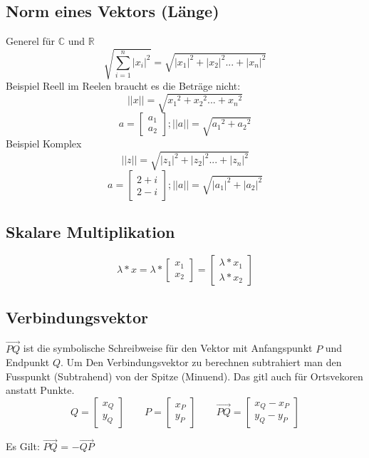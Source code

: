 \documentclass[10pt,a4paper,twocolumn]{article}
\begin{document}
	\subsection{Norm eines Vektors (Länge)}
	Generel für $\mathbb{C}$ und  $\mathbb{R}$
	$$\sqrt{\sum_{i=1}^n |x_i|^2} =\sqrt{|x_1|^2+|x_2|^2...+|x_n|^2}$$
	Beispiel Reell
	im Reelen braucht es die Beträge nicht:
	$$||x|| = \sqrt{{x_1}^2+{x_2}^2 ... + {x_n}^2}$$
	$$a=\begin{bmatrix}
		a_{1} \\
		a_{2}
	\end{bmatrix}; ||a|| = \sqrt{{a_1}^2+{a_2}^2} $$
	Beispiel Komplex
	$$||z|| = \sqrt{{|z_1|}^2+{|z_2|}^2 ... + {|z_n|}^2}$$
	$$a=\begin{bmatrix}
		2+i \\
		2-i
	\end{bmatrix}; ||a|| = \sqrt{|a_1|^2+|a_2|^2} $$
	\subsection{Skalare Multiplikation}
	$$\lambda * x = \lambda * \begin{bmatrix} x_1 \\ x_2 \end{bmatrix} = \begin{bmatrix} \lambda *x_1 \\ \lambda * x_2 \end{bmatrix}$$
	\subsection{Verbindungsvektor}
	$\overrightarrow{PQ}$ ist die symbolische Schreibweise für den Vektor mit Anfangspunkt $P$ und Endpunkt $Q$. Um Den Verbindungsvektor zu berechnen subtrahiert man den Fusspunkt (Subtrahend) von der Spitze (Minuend). Das gitl auch für Ortsvekoren anstatt Punkte.
	\[
	Q = \begin{bmatrix} x_Q \\ y_Q \end{bmatrix}
	\qquad
	P = \begin{bmatrix} x_P \\ y_P \end{bmatrix}
	\qquad
	\overrightarrow{PQ}
	= \begin{bmatrix} x_Q - x_P \\ y_Q - y_P \end{bmatrix}
	\]
	
	Es Gilt: $\overrightarrow{PQ}$ = $-\overrightarrow{QP}$
	
\end{document}
